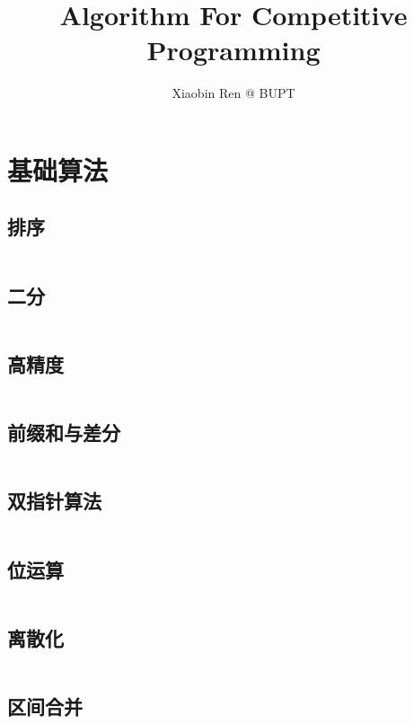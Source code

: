 \documentclass[a4paper,12pt]{article}
\author{Xiaobin Ren @ BUPT}
\title{Algorithm For Competitive Programming}
\begin{document}
 
\maketitle %
\newpage %
\tableofcontents %


\newpage
\section{基础算法}
\subsection{排序}
\inputminted[breaklines]{c++}{basic/sort.cc}
\subsection{二分}
\inputminted[breaklines]{c++}{basic/binary_search.cc}
\subsection{高精度}
\inputminted[breaklines]{c++}{basic/high_precision.cc}
\subsection{前缀和与差分}
\inputminted[breaklines]{c++}{basic/prefixsum_diff.cc}
\subsection{双指针算法}
\inputminted[breaklines]{c++}{basic/double_pointer.cc}
\subsection{位运算}
\inputminted[breaklines]{c++}{basic/bit.cc}
\subsection{离散化}
\inputminted[breaklines]{c++}{basic/disc.cc}
\subsection{区间合并}
\inputminted[breaklines]{c++}{basic/interval_union.cc}
\end{document}
